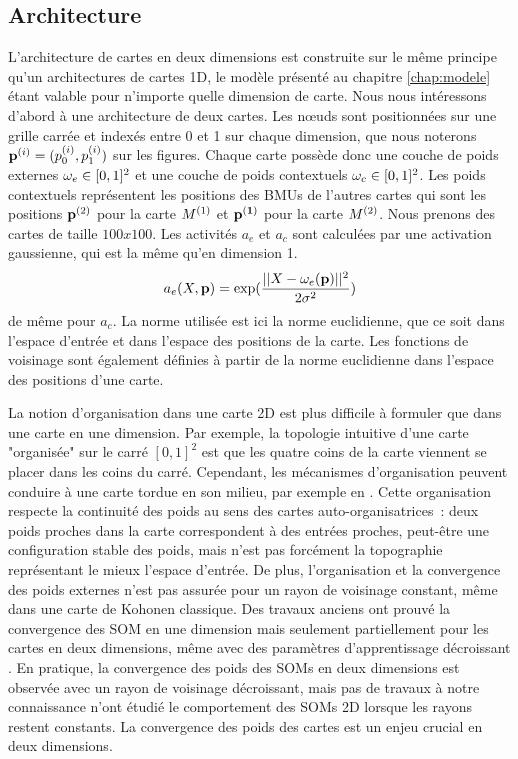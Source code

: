 \documentclass[../main]{subfiles}
\begin{document}
\subsection{Architecture}

L'architecture de cartes en deux dimensions est construite sur le même principe qu'un architectures de cartes 1D, le modèle présenté au chapitre \ref{chap:modele} étant valable pour n'importe quelle dimension de carte.
Nous nous intéressons d'abord à une architecture de deux cartes. Les n\oe{}uds sont positionnées sur une grille carrée et indexés entre 0 et 1 sur chaque dimension, que nous noterons $\mathbf{p}^{({i})} = (p^{({i})}_0, p^{({i})}_1)$ sur les figures. 
Chaque carte possède donc une couche de poids externes $\omega_{e} \in [0,1]^2$ et une couche de poids contextuels $\omega_c \in [0,1]^2$.
Les poids contextuels représentent les positions des BMUs de l'autres cartes qui sont les positions $\mathbf{p}^{({2})}$ pour la carte $M^{({1})}$ et $\mathbf{p^{({1})}}$ pour la carte $M^{({2})}$. Nous prenons des cartes de taille $100x100$.
Les activités $a_e$ et $a_c$ sont calculées par une activation gaussienne, qui est la même qu'en dimension 1.
$$a_e(X,\mathbf{p}) = \exp(\frac{||X - \omega_e(\mathbf{p}) ||^2}{2\sigma^2})$$
de même pour $a_c$.
La norme utilisée est ici la norme euclidienne, que ce soit dans l'espace d'entrée et dans l'espace des positions de la carte.
Les fonctions de voisinage sont également définies à partir de la norme euclidienne dans l'espace des positions d'une carte.

La notion d'organisation dans une carte 2D est plus difficile à formuler que dans une carte en une dimension. 
Par exemple, la topologie intuitive d'une carte "organisée" sur le carré $[0,1]^2$ est que les quatre coins de la carte viennent se placer dans les coins du carré.
Cependant, les mécanismes d'organisation peuvent conduire à une carte tordue en son milieu, par exemple en \label{fig:torsion}. 
Cette organisation respecte la continuité des poids au sens des cartes auto-organisatrices~: deux poids proches dans la carte correspondent à des entrées proches, peut-être une configuration stable des poids, mais n'est pas forcément la topographie représentant le mieux l'espace d'entrée. 
De plus, l'organisation et la convergence des poids externes n'est pas assurée pour un rayon de voisinage constant, même dans une carte de Kohonen classique. Des travaux anciens ont prouvé la convergence des SOM en une dimension \cite{Cottrell1998TheoreticalAO} mais seulement partiellement pour les cartes en deux dimensions, même avec des paramètres d'apprentissage décroissant \cite{flanagan_self-organisation_1996}. En pratique, la convergence des poids des SOMs en deux dimensions est observée avec un rayon de voisinage décroissant, mais pas de travaux à notre connaissance n'ont étudié le comportement des SOMs 2D lorsque les rayons restent constants. La convergence des poids des cartes est un enjeu crucial en deux dimensions.
\end{document}
